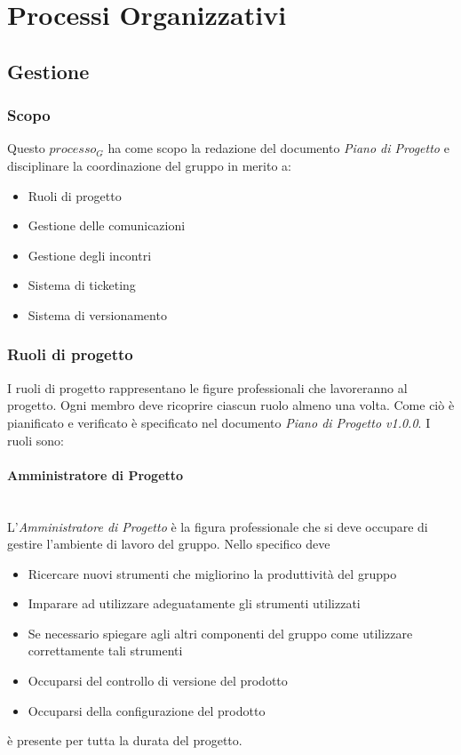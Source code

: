 \section{Processi Organizzativi}


\subsection{Gestione}

	\subsubsection{Scopo}
	Questo $processo_G$ ha come scopo la redazione del documento \emph{Piano di Progetto} e disciplinare la coordinazione del gruppo in merito a:
	\begin{itemize}
		\item Ruoli di progetto
		\item Gestione delle comunicazioni
		\item Gestione degli incontri
		\item Sistema di ticketing
		\item Sistema di versionamento
		
	\end{itemize}
	\subsubsection{Ruoli di progetto} 
	I ruoli di progetto rappresentano le figure professionali che lavoreranno al progetto.  Ogni membro deve ricoprire ciascun ruolo almeno una volta. Come ciò è pianificato e verificato è specificato nel documento \emph{Piano di Progetto v1.0.0}. I ruoli sono:
		\paragraph{Amministratore di Progetto} \mbox{} \\
		L'\emph{Amministratore di Progetto} è la figura professionale che si deve occupare di gestire l'ambiente di lavoro del gruppo. Nello specifico deve
		\begin{itemize}
			\item Ricercare nuovi strumenti che migliorino la produttività del gruppo
			\item Imparare ad utilizzare adeguatamente gli strumenti utilizzati
			\item Se necessario spiegare agli altri componenti del gruppo come utilizzare correttamente tali strumenti
			\item Occuparsi del controllo di versione del prodotto 
			\item Occuparsi della configurazione del prodotto
		\end{itemize}
		è presente per tutta la durata del progetto.
